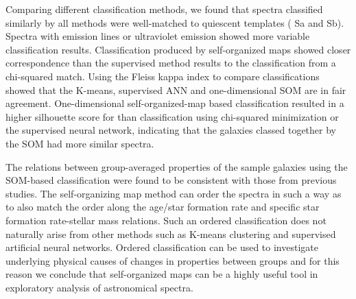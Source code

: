     
    Comparing different classification methods, we found that spectra classified similarly by all methods were well-matched to quiescent templates ( Sa and Sb). 
    Spectra with emission lines or ultraviolet emission showed more variable classification results.
    Classification produced by self-organized maps showed closer correspondence than the supervised method results to the classification from a chi-squared match.
    Using the Fleiss kappa index to compare classifications showed that the K-means, supervised ANN and one-dimensional SOM are in fair agreement.
    One-dimensional self-organized-map based classification resulted in a 
    higher silhouette score for than classification using chi-squared minimization or the supervised neural network, indicating that the galaxies classed together by the SOM had more similar spectra.

The relations between group-averaged properties of the sample galaxies using the SOM-based classification were found to be consistent with those from previous studies. 
    The self-organizing map method can order the spectra in such a way as to also match the order along the age/star formation rate and specific star formation rate-stellar mass relations.
    Such an ordered classification does not naturally arise from other methods such as K-means clustering and supervised artificial neural networks.
    Ordered classification can be used to investigate underlying physical causes of changes in properties between groups and for this reason we conclude that self-organized maps can be a highly useful tool in exploratory analysis of astronomical spectra.
